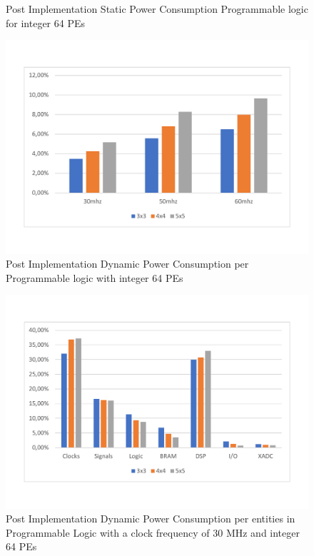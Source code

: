 \begin{itemize}
\begin{figure}[!htbp]
\caption{Post Implementation Static Power Consumption Programmable logic for integer 64 PEs }
\label{fig:staticpowint64}
\end{figure}
\begin{figure}[!htbp]
\centering
\captionsetup{justification=centering}
\includegraphics[scale=0.5,angle=0]{./figure/graphs/power_pldyn_int64_freq.pdf}
\caption{Post Implementation Dynamic Power Consumption per Programmable logic with integer 64 PEs}
\label{fig:dynpowint64}
\end{figure}
\begin{figure}[!htbp]
\centering
\captionsetup{justification=centering}
\includegraphics[scale=0.6,angle=0]{./figure/graphs/power_pldyn_div_int64_freq_30mhz.pdf}
\caption{Post Implementation Dynamic Power Consumption per entities in Programmable Logic with a clock frequency of 30 MHz and integer 64 PEs}

\end{figure}
\end{itemize}
